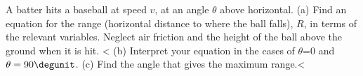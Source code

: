         A batter hits a baseball at speed
        $v$, at an angle $\theta$ above horizontal.\hwendpart
        (a) Find an equation for the range (horizontal distance to
        where the ball falls), $R$, in terms of the relevant variables. Neglect air friction
        and the height of the ball above the ground when it is hit.
        <%
        (b) Interpret your equation in the cases of $\theta$=0 and $\theta=90\degunit$.\hwendpart
        (c) Find the angle that gives the maximum range.<%
